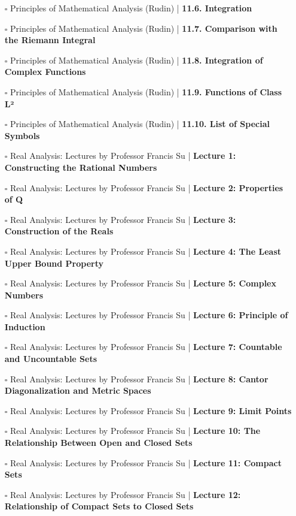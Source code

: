 \documentclass[a4, landscape, 12pt]{article}
\newcommand{\checkbox}{$\square$}%
\begin{document}
\begin{itemize}
{}
\item [\checkbox] Principles of Mathematical Analysis (Rudin)  | \textbf{11.6. Integration
}
\item [\checkbox] Principles of Mathematical Analysis (Rudin)  | \textbf{11.7. Comparison with the Riemann Integral
}
\item [\checkbox] Principles of Mathematical Analysis (Rudin)  | \textbf{11.8. Integration of Complex Functions
}
\item [\checkbox] Principles of Mathematical Analysis (Rudin)  | \textbf{11.9. Functions of Class L²
}
\item [\checkbox] Principles of Mathematical Analysis (Rudin)  | \textbf{11.10. List of Special Symbols
}
\item [\checkbox] Real Analysis: Lectures by Professor Francis Su  | \textbf{Lecture 1: Constructing the Rational Numbers
}
\item [\checkbox] Real Analysis: Lectures by Professor Francis Su  | \textbf{Lecture 2: Properties of Q
}
\item [\checkbox] Real Analysis: Lectures by Professor Francis Su  | \textbf{Lecture 3: Construction of the Reals
}
\item [\checkbox] Real Analysis: Lectures by Professor Francis Su  | \textbf{Lecture 4: The Least Upper Bound Property
}
\item [\checkbox] Real Analysis: Lectures by Professor Francis Su  | \textbf{Lecture 5: Complex Numbers
}
\item [\checkbox] Real Analysis: Lectures by Professor Francis Su  | \textbf{Lecture 6: Principle of Induction
}
\item [\checkbox] Real Analysis: Lectures by Professor Francis Su  | \textbf{Lecture 7: Countable and Uncountable Sets
}
\item [\checkbox] Real Analysis: Lectures by Professor Francis Su  | \textbf{Lecture 8: Cantor Diagonalization and Metric Spaces
}
\item [\checkbox] Real Analysis: Lectures by Professor Francis Su  | \textbf{Lecture 9: Limit Points
}
\item [\checkbox] Real Analysis: Lectures by Professor Francis Su  | \textbf{Lecture 10: The Relationship Between Open and Closed Sets
}
\item [\checkbox] Real Analysis: Lectures by Professor Francis Su  | \textbf{Lecture 11: Compact Sets
}
\item [\checkbox] Real Analysis: Lectures by Professor Francis Su  | \textbf{Lecture 12: Relationship of Compact Sets to Closed Sets
}
\end{itemize}
\end{document}
